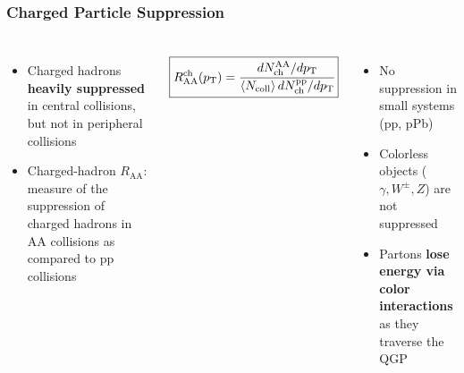 \begin{frame}
  \frametitle{\textbf{Charged Particle Suppression}}
  \begin{columns}
    \begin{itemize}
    \item Charged hadrons \textbf{heavily suppressed} in central collisions, but not in peripheral collisions
    \item Charged-hadron $R_{\text{AA}}$: measure of the suppression of charged hadrons in AA collisions as compared to pp collisions
    \end{itemize}
    \begin{align*}
      \boxed{R_{\text{AA}}^{\text{ch}} (p_{\text{T}}) = \cfrac{dN^{\text{AA}}_{\text{ch}} / dp_{\text{T}}}{\left< N_{\text{coll}} \right> dN^{\text{pp}}_{\text{ch}} / dp_{\text{T}}}}
    \end{align*}


    \begin{itemize}
    \item No suppression in small systems (pp, pPb)
    \item Colorless objects ($\gamma, W^{\pm}, Z$) are not suppressed
    \item Partons \textbf{lose energy via color interactions} as they traverse the QGP 
    \end{itemize}
  \end{columns}
\end{frame}
